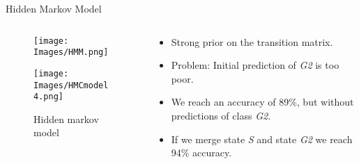 \documentclass{beamer}
\begin{document}
\begin{frame}{Hidden Markov Model}
\begin{columns}[T] %
\begin{column}{.48\textwidth}
\begin{figure}[!ht]
\centering
\texttt{[image: Images/HMM.png]}
\label{trajectory}
\end{figure}
\begin{figure}[!ht]
\centering
\texttt{[image: Images/HMCmodel4.png]}
\caption{ Hidden markov model}
\label{statetransition}
\end{figure}
\end{column}%
\hfill%
\begin{column}{.48\textwidth}
\begin{itemize}
\item Strong prior on the transition matrix.
\item Problem: Initial prediction of \textit{G2} is too poor. 
\item We reach an accuracy of 89\%, but without predictions of class \textit{G2}.
\item If we merge state \textit{S} and state \textit{G2} we reach 94\% accuracy.
\end{itemize}
\end{column}%
\end{columns}
\end{frame}
\end{document}
